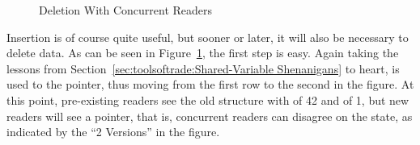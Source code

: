 \begin{figure}
\centering
{}
\caption{Deletion With Concurrent Readers}
\label{fig:defer:Deletion With Concurrent Readers}
\end{figure}

Insertion is of course quite useful, but sooner or later, it will also
be necessary to delete data.
As can be seen in
Figure~\ref{fig:defer:Deletion With Concurrent Readers},
the first step is easy.
Again taking the lessons from
Section~\ref{sec:toolsoftrade:Shared-Variable Shenanigans}
to heart,  is used to  the pointer,
thus moving from the first row to the second in the figure.
At this point, pre-existing readers see the old structure with
 of 42 and  of 1, but new readers will see
a  pointer, that is, concurrent readers can disagree on
the state, as indicated by the ``2 Versions'' in the figure.

